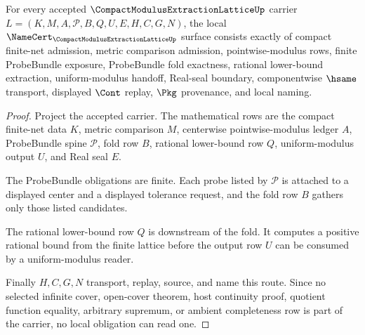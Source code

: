 \begin{theorem}
\label{thm:compact-modulus-extraction-lattice-namecert-obligations}
For every accepted $\CompactModulusExtractionLatticeUp$ carrier $L=(K,M,A,\mathcal{P},B,Q,U,E,H,C,G,N)$, the local $\NameCert_{\CompactModulusExtractionLatticeUp}$ surface consists exactly of compact finite-net admission, metric comparison admission, pointwise-modulus rows, finite ProbeBundle exposure, ProbeBundle fold exactness, rational lower-bound extraction, uniform-modulus handoff, Real-seal boundary, componentwise $\hsame$ transport, displayed $\Cont$ replay, $\Pkg$ provenance, and local naming.
\end{theorem}
\begin{proof}
Project the accepted carrier. The mathematical rows are the compact finite-net data $K$, metric comparison $M$, centerwise pointwise-modulus ledger $A$, ProbeBundle spine $\mathcal{P}$, fold row $B$, rational lower-bound row $Q$, uniform-modulus output $U$, and Real seal $E$.

The ProbeBundle obligations are finite. Each probe listed by $\mathcal{P}$ is attached to a displayed center and a displayed tolerance request, and the fold row $B$ gathers only those listed candidates.

The rational lower-bound row $Q$ is downstream of the fold. It computes a positive rational bound from the finite lattice before the output row $U$ can be consumed by a uniform-modulus reader.

Finally $H,C,G,N$ transport, replay, source, and name this route. Since no selected infinite cover, open-cover theorem, host continuity proof, quotient function equality, arbitrary supremum, or ambient completeness row is part of the carrier, no local obligation can read one.
\end{proof}

